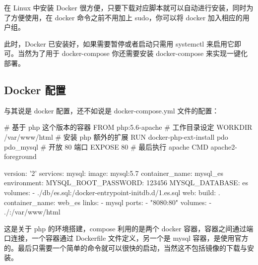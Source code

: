 在 Linux 中安装 Docker 很方便，只要下载对应脚本就可以自动进行安装，同时为了方便使用，在 docker 命令之前不用加上 sudo，你可以将 docker 加入相应的用户组。

此时，Docker 已安装好，如果需要暂停或者启动只需用 systemctl 来启用它即可。当然为了用于 docker-compose 你还需要安装 docker-compose 来实现一键化部署。

\subsection{Docker 配置}

与其说是 docker 配置，还不如说是 docker-compose.yml 文件的配置：

\begin{code}
# 基于 php 这个版本的容器
FROM php:5.6-apache
# 工作目录设定
WORKDIR /var/www/html
# 安装 php 额外的扩展
RUN docker-php-ext-install pdo pdo_mysql
# 开放 80 端口
EXPOSE 80
# 最后执行 apache
CMD apache2-foreground
\end{code}

\begin{code}
version: '2'
services:
  mysql:
    image: mysql:5.7
    container_name: mysql_es
    environment:
      MYSQL_ROOT_PASSWORD: 123456
      MYSQL_DATABASE: es
    volumes:
      - ./db/es.sql:/docker-entrypoint-initdb.d/1.es.sql
  web:
    build: .
    container_name: web_es
    links:
      - mysql
    ports:
      - "8080:80"
    volumes:
      - ./:/var/www/html
\end{code}

这是关于 php 的环境搭建，compose 利用的是两个 docker 容器，容器之间通过端口连接，一个容器通过 Dockerfile 文件定义，另一个是 mysql 容器，是使用官方的。最后只需要一个简单的命令就可以很快的启动，当然这不包括镜像的下载与安装。

